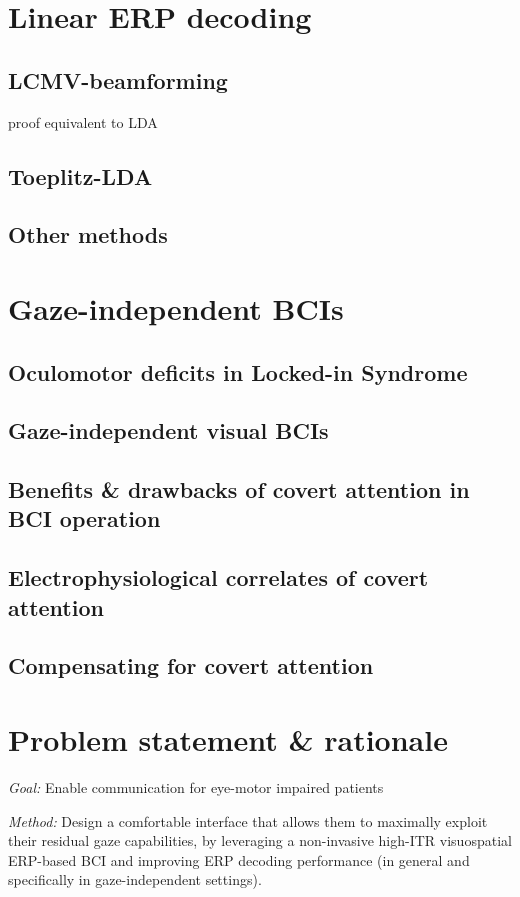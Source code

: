 \chapter{Linear ERP decoding}
\section{LCMV-beamforming}
proof equivalent to LDA
\section{Toeplitz-LDA}
\section{Other methods}

\chapter{Gaze-independent BCIs}
\section{Oculomotor deficits in Locked-in Syndrome}
\section{Gaze-independent visual BCIs}
\section{Benefits \& drawbacks of covert attention in BCI operation}
\section{Electrophysiological correlates of covert attention}
\section{Compensating for covert attention}

\chapter{Problem statement \& rationale}
\emph{Goal:} Enable communication for eye-motor impaired patients

\emph{Method:} Design a comfortable interface that allows them to maximally exploit
their residual gaze capabilities, by leveraging a non-invasive high-ITR
visuospatial ERP-based BCI and improving ERP decoding performance (in general
and specifically in gaze-independent settings).

